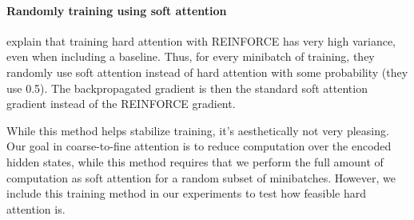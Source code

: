 \documentclass[11pt]{report}
\begin{document}
\paragraph{Randomly training using soft attention} \citet{xu2015captioning} explain that training hard attention with REINFORCE has very high variance, even when including a baseline. Thus, for every minibatch of training, they randomly use soft attention instead of hard attention with some probability (they use 0.5).
The backpropagated gradient is then the standard soft attention gradient instead of the REINFORCE gradient.

While this method helps stabilize training, it's aesthetically not very pleasing. Our goal in coarse-to-fine attention is to reduce computation over the encoded hidden states, while this method requires that we perform the full amount of computation as soft attention for a random subset of minibatches. However, we include this training method in our experiments to test how feasible hard attention is.



%
%
%
\end{document}
